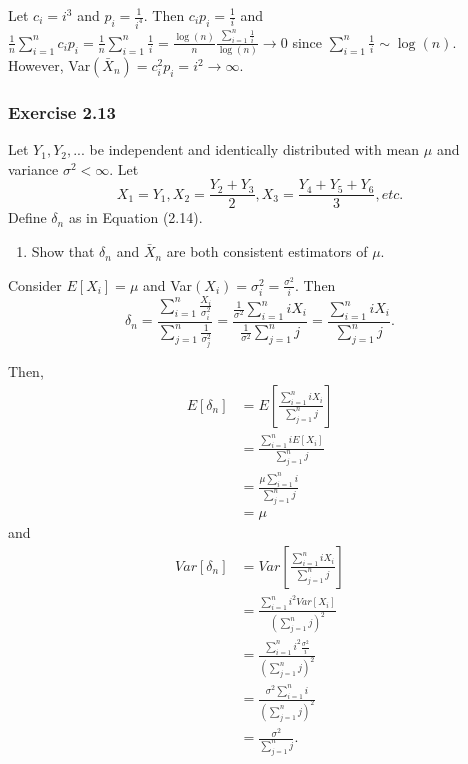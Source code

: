 \documentclass[12pt,]{article}
\providecommand{\tightlist}{%
  \setlength{\itemsep}{0pt}\setlength{\parskip}{0pt}}
\begin{document}
Let \(c_i=i^3\) and \(p_i = \frac{1}{i^4}.\) Then
\(c_ip_i = \frac{1}{i}\) and
\(\frac{1}{n}\sum_{i=1}^n c_ip_i = \frac{1}{n}\sum_{i=1}^n\frac{1}{i}=\frac{\log(n)}{n}\frac{\sum_{i=1}^n\frac{1}{i}}{\log(n)}\rightarrow 0\)
since \(\sum_{i=1}^n\frac{1}{i}\sim\log(n).\) However,
Var\((\bar{X}_n) = c_i^2p_i=i^2\rightarrow \infty.\)

\hypertarget{exercise-2.13}{%
\subsubsection{Exercise 2.13}\label{exercise-2.13}}

Let \(Y_1, Y_2,...\) be independent and identically distributed with
mean \(\mu\) and variance \(\sigma^2 < \infty.\) Let
\[X_1 = Y_1,  X_2 = \frac{Y_2+Y_3}{2},  X_3 = \frac{Y_4+Y_5+Y_6}{3}, etc.\]
Define \(\delta_n\) as in Equation (2.14).

\begin{enumerate}
\def\labelenumi{(\alph{enumi})}
\tightlist
\item
  Show that \(\delta_n\) and \(\bar{X}_n\) are both consistent
  estimators of \(\mu.\)
\end{enumerate}

Consider \(E[X_i]=\mu\) and Var\((X_i) =\sigma_i^2=\frac{\sigma^2}{i}.\)
Then
\[\delta_n = \frac{\sum_{i=1}^n\frac{X_i}{\sigma_i^2}}{\sum_{j=1}^n\frac{1}{\sigma_j^2}}=\frac{\frac{1}{\sigma^2}\sum_{i=1}^niX_i}{\frac{1}{\sigma^2}\sum_{j=1}^nj}=\frac{\sum_{i=1}^niX_i}{\sum_{j=1}^nj}.\]

Then, \begin{align*}
E[\delta_n]&=E\left[\frac{\sum_{i=1}^niX_i}{\sum_{j=1}^nj}\right]\\
&=\frac{\sum_{i=1}^niE[X_i]}{\sum_{j=1}^nj}\\
&=\frac{\mu \sum_{i=1}^ni}{\sum_{j=1}^nj}\\
&=\mu
\end{align*} and \begin{align*}
Var[\delta_n]&=Var\left[\frac{\sum_{i=1}^niX_i}{\sum_{j=1}^nj}\right]\\
&=\frac{\sum_{i=1}^ni^2Var[X_i]}{\left(\sum_{j=1}^nj\right)^2}\\
&=\frac{\sum_{i=1}^ni^2\frac{\sigma^2}{i}}{\left(\sum_{j=1}^nj\right)^2}\\
&=\frac{\sigma^2\sum_{i=1}^ni}{\left(\sum_{j=1}^nj\right)^2}\\
&=\frac{\sigma^2}{\sum_{j=1}^nj}.
\end{align*}
\end{document}
